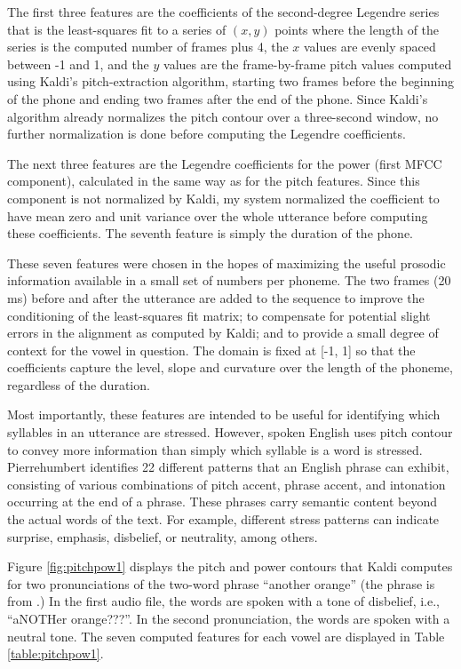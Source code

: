 \documentclass{article}
\begin{document}
The first three features are the coefficients of the second-degree Legendre series that is the least-squares fit to a series of $(x, y)$ points where the length of the series is the computed number of frames plus 4, the $x$ values are evenly spaced between -1 and 1, and the $y$ values are the frame-by-frame pitch values computed using Kaldi's pitch-extraction algorithm, starting two frames before the beginning of the phone and ending two frames after the end of the phone.
Since Kaldi's algorithm already normalizes the pitch contour over a three-second window, no further normalization is done before computing the Legendre coefficients.

The next three features are the Legendre coefficients for the power (first MFCC component), calculated in the same way as for the pitch features. Since this component is not normalized by Kaldi, my system normalized the coefficient to have mean zero and unit variance over the whole utterance before computing these coefficients.
The seventh feature is simply the duration of the phone.

These seven features were chosen in the hopes of maximizing the useful prosodic information available in a small set of numbers per phoneme.
The two frames (20 ms) before and after the utterance are added to the sequence to improve the conditioning of the least-squares fit matrix; to compensate for potential slight errors in the alignment as computed by Kaldi; and to provide a small degree of context for the vowel in question.
The domain is fixed at [-1, 1] so that the coefficients capture the level, slope and curvature over the length of the phoneme, regardless of the duration.

Most importantly, these features are intended to be useful for identifying which syllables in an utterance are stressed. However, spoken English uses pitch contour to convey more information than simply which syllable is a word is stressed. Pierrehumbert \cite{pierrehumbert1980phonology} identifies 22 different patterns that an English phrase can exhibit, consisting of various combinations of pitch accent, phrase accent, and intonation occurring at the end of a phrase.
These phrases carry semantic content beyond the actual words of the text. For example, different stress patterns can indicate surprise, emphasis, disbelief, or neutrality, among others.

Figure \ref{fig:pitchpow1} displays the pitch and power contours that Kaldi computes for two pronunciations of the two-word phrase ``another orange'' (the phrase is from \cite{pierrehumbert1980phonology}.) In the first audio file, the words are spoken with a tone of disbelief, i.e., ``aNOTHer orange???''. In the second pronunciation, the words are spoken with a neutral tone. The seven computed features for each vowel are displayed in Table \ref{table:pitchpow1}.
\end{document}

